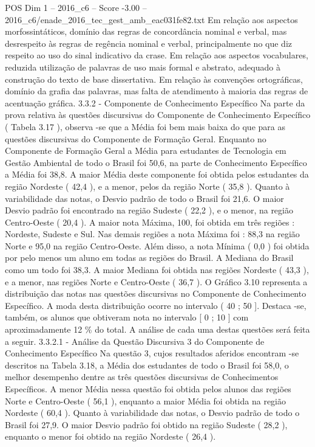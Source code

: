 \begin{textsample}{POS Dim 1 – 2016\_c6 – Score -3.00 – 2016\_c6/enade\_2016\_tec\_gest\_amb\_eac031fe82.txt}
Em relação aos aspectos morfossintáticos, domínio das regras de concordância nominal e verbal, mas desrespeito às regras de regência nominal e verbal, principalmente no que diz respeito ao uso do sinal indicativo da crase.
Em relação aos aspectos vocabulares, reduzida utilização de palavras de uso mais formal e abstrato, adequado à construção do texto de base dissertativa.
Em relação às convenções ortográficas, domínio da grafia das palavras, mas falta de atendimento à maioria das regras de acentuação gráfica. 3.3.2 - Componente de Conhecimento Específico Na parte da prova relativa às questões discursivas do Componente de Conhecimento Específico ( Tabela 3.17 ), observa -se que a Média foi bem mais baixa do que para as questões discursivas do Componente de Formação Geral.
Enquanto no Componente de Formação Geral a Média para estudantes de Tecnologia em Gestão Ambiental de todo o Brasil foi 50,6, na parte de Conhecimento Específico a Média foi 38,8.
A maior Média deste componente foi obtida pelos estudantes da região Nordeste ( 42,4 ), e a menor, pelos da região Norte ( 35,8 ).
Quanto à variabilidade das notas, o Desvio padrão de todo o Brasil foi 21,6.
O maior Desvio padrão foi encontrado na região Sudeste ( 22,2 ), e o menor, na região Centro-Oeste ( 20,4 ).
A maior nota Máxima, 100, foi obtida em três regiões : Nordeste, Sudeste e Sul.
Nas demais regiões a nota Máxima foi : 88,3 na região Norte e 95,0 na região Centro-Oeste.
Além disso, a nota Mínima ( 0,0 ) foi obtida por pelo menos um aluno em todas as regiões do Brasil.
A Mediana do Brasil como um todo foi 38,3.
A maior Mediana foi obtida nas regiões Nordeste ( 43,3 ), e a menor, nas regiões Norte e Centro-Oeste ( 36,7 ).
O Gráfico 3.10 representa a distribuição das notas nas questões discursivas no Componente de Conhecimento Específico.
A moda desta distribuição ocorre no intervalo ( 40 ; 50 ].
Destaca -se, também, os alunos que obtiveram nota no intervalo [ 0 ; 10 ] com aproximadamente 12 \% do total.
A análise de cada uma destas questões será feita a seguir. 3.3.2.1 - Análise da Questão Discursiva 3 do Componente de Conhecimento Específico Na questão 3, cujos resultados aferidos encontram -se descritos na Tabela 3.18, a Média dos estudantes de todo o Brasil foi 58,0, o melhor desempenho dentre as três questões discursivas de Conhecimentos Específicos.
A menor Média nessa questão foi obtida pelos alunos das regiões Norte e Centro-Oeste ( 56,1 ), enquanto a maior Média foi obtida na região Nordeste ( 60,4 ).
Quanto à variabilidade das notas, o Desvio padrão de todo o Brasil foi 27,9.
O maior Desvio padrão foi obtido na região Sudeste ( 28,2 ), enquanto o menor foi obtido na região Nordeste ( 26,4 ).

\end{textsample}
